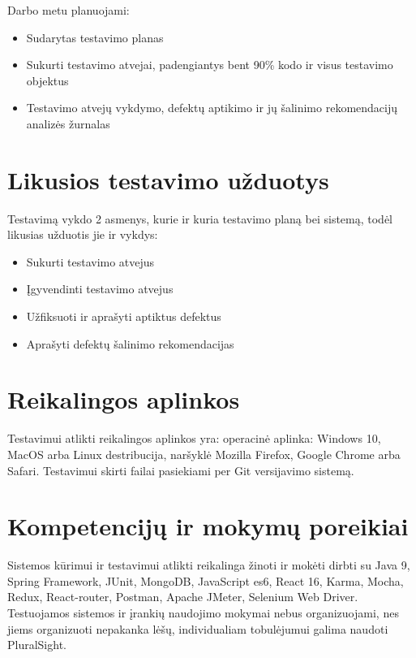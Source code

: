 \documentclass{VUMIFPSkursinis}
\begin{document}
    Darbo metu planuojami: 

    \begin{itemize}
    	\item Sudarytas testavimo planas
    	\item Sukurti testavimo atvejai, padengiantys bent 90\% kodo ir visus testavimo objektus
    	\item Testavimo atvejų vykdymo, defektų aptikimo ir jų šalinimo rekomendacijų analizės žurnalas
    \end{itemize}

    \section{Likusios testavimo užduotys}

    Testavimą vykdo 2 asmenys, kurie ir kuria testavimo planą bei sistemą, todėl likusias užduotis jie ir vykdys:

    \begin{itemize}
    	\item Sukurti testavimo atvejus
    	\item Įgyvendinti testavimo atvejus
    	\item Užfiksuoti ir aprašyti aptiktus defektus
    	\item Aprašyti defektų šalinimo rekomendacijas
    \end{itemize}

    \section{Reikalingos aplinkos}

    Testavimui atlikti reikalingos aplinkos yra: operacinė aplinka: Windows 10, MacOS arba Linux destribucija, naršyklė Mozilla Firefox, Google Chrome arba Safari. 
    Testavimui skirti failai pasiekiami per Git versijavimo sistemą. 

    \section{Kompetencijų ir mokymų poreikiai}

    Sistemos kūrimui ir testavimui atlikti reikalinga žinoti ir mokėti dirbti su Java 9, Spring Framework, JUnit,
     MongoDB, JavaScript es6, React 16, Karma, Mocha, Redux, React-router, Postman, Apache JMeter, Selenium Web Driver. 
    Testuojamos sistemos ir įrankių naudojimo mokymai nebus organizuojami, nes jiems organizuoti nepakanka lėšų, individualiam tobulėjumui galima naudoti PluralSight.
\end{document}

